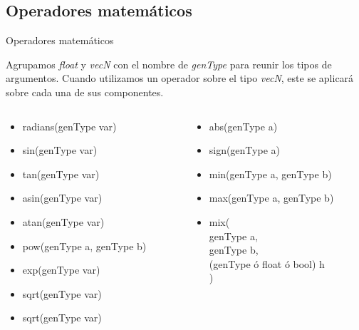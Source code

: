 \subsection{Operadores matemáticos}
\begin{frame}{Operadores matemáticos}
    
    Agrupamos \textit{float} y \textit{vecN} con el nombre de \textit{genType} para reunir los tipos de argumentos. Cuando utilizamos un operador sobre el tipo \textit{vecN}, este se aplicará sobre cada una de sus componentes.
    
    \vfill
    
    \begin{columns}[onlytextwidth]
        \begin{column}{0.47\textwidth}
            \begin{itemize}
                \item radians(genType var)
                \item sin(genType var)
                \item tan(genType var)
                \item asin(genType var)
                \item atan(genType var)
                \item pow(genType a, genType b)
                \item exp(genType var)
                \item sqrt(genType var)
                \item sqrt(genType var)
            \end{itemize}
        \end{column}
        
        \begin{column}{0.47\textwidth}
            \begin{itemize}
                \item abs(genType a)
                \item sign(genType a)
                \item min(genType a, genType b)
                \item max(genType a, genType b)
                \item mix(\\
                    \tab[0.5cm]genType a,\\
                    \tab[0.5cm]genType b, \\
                    \tab[0.5cm](genType ó float ó bool) h \\
                )
            \end{itemize}
        \end{column}
        
    \end{columns}

\end{frame}


